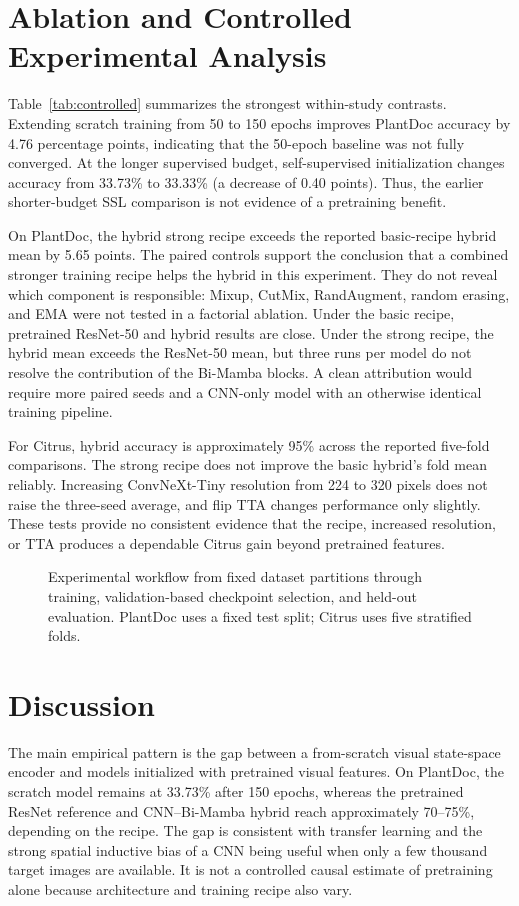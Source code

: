 \documentclass[conference]{IEEEtran}
\begin{document}
\section{Ablation and Controlled Experimental Analysis}
Table~\ref{tab:controlled} summarizes the strongest within-study contrasts. Extending scratch training from 50 to 150 epochs improves PlantDoc accuracy by 4.76 percentage points, indicating that the 50-epoch baseline was not fully converged. At the longer supervised budget, self-supervised initialization changes accuracy from 33.73\% to 33.33\% (a decrease of 0.40 points). Thus, the earlier shorter-budget SSL comparison is not evidence of a pretraining benefit.
\ControlledTable

On PlantDoc, the hybrid strong recipe exceeds the reported basic-recipe hybrid mean by 5.65 points. The paired controls support the conclusion that a combined stronger training recipe helps the hybrid in this experiment. They do not reveal which component is responsible: Mixup, CutMix, RandAugment, random erasing, and EMA were not tested in a factorial ablation. Under the basic recipe, pretrained ResNet-50 and hybrid results are close. Under the strong recipe, the hybrid mean exceeds the ResNet-50 mean, but three runs per model do not resolve the contribution of the Bi-Mamba blocks. A clean attribution would require more paired seeds and a CNN-only model with an otherwise identical training pipeline.

For Citrus, hybrid accuracy is approximately 95\% across the reported five-fold comparisons. The strong recipe does not improve the basic hybrid's fold mean reliably. Increasing ConvNeXt-Tiny resolution from 224 to 320 pixels does not raise the three-seed average, and flip TTA changes performance only slightly. These tests provide no consistent evidence that the recipe, increased resolution, or TTA produces a dependable Citrus gain beyond pretrained features.

\begin{figure}[t]
\centering
\ExperimentalWorkflowDiagram
\caption{Experimental workflow from fixed dataset partitions through training, validation-based checkpoint selection, and held-out evaluation. PlantDoc uses a fixed test split; Citrus uses five stratified folds.}
\label{fig:workflow}
\end{figure}

\section{Discussion}
The main empirical pattern is the gap between a from-scratch visual state-space encoder and models initialized with pretrained visual features. On PlantDoc, the scratch model remains at 33.73\% after 150 epochs, whereas the pretrained ResNet reference and CNN--Bi-Mamba hybrid reach approximately 70--75\%, depending on the recipe. The gap is consistent with transfer learning and the strong spatial inductive bias of a CNN being useful when only a few thousand target images are available. It is not a controlled causal estimate of pretraining alone because architecture and training recipe also vary.
\end{document}
